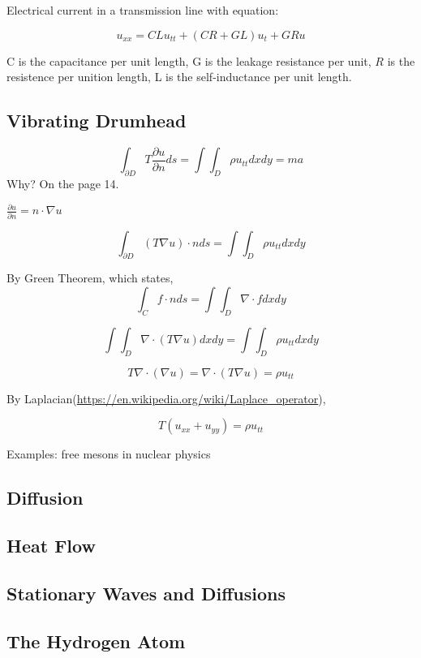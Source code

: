 \documentclass{article}
\begin{document}
Electrical current in a transmission line with equation:

$$u_{xx} = CLu_{tt} + (CR+GL)u_t + GRu$$

C is the capacitance per unit length, G is the leakage resistance per unit, $R$ is the resistence per unition length, L is the self-inductance per unit length.

\subsection{Vibrating Drumhead}


$$\int_{\partial D} T \frac{\partial{u}}{\partial n} ds =\int\int_{D} \rho u_{tt} dx dy =ma$$ Why? On the page 14.

$\frac{\partial{u}}{\partial n} = n \cdot \nabla u$

$$\int_{\partial D}  (T\nabla u) \cdot n ds =\int\int_{D} \rho u_{tt} dx dy$$


By Green Theorem, which states,
$$\int_C f \cdot n ds = \int\int_D \nabla \cdot f  dxdy$$

$$\int\int_D \nabla \cdot(T\nabla u) dxdy =\int\int_{D} \rho u_{tt} dx dy$$

$$T \nabla \cdot(\nabla u)= \nabla \cdot(T\nabla u) = \rho u_{tt}$$

By Laplacian(\url{https://en.wikipedia.org/wiki/Laplace_operator}),

$$T(u_{xx}+u_{yy}) = \rho u_{tt}$$

Examples: free mesons in nuclear physics

\subsection{Diffusion}

\subsection{Heat Flow}

\subsection{Stationary Waves and Diffusions}

\subsection{The Hydrogen Atom}
\end{document}
